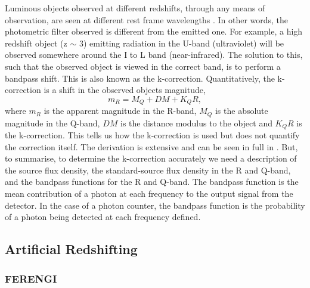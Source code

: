 \documentclass[fleqn,usenatbib]{mnras}
\begin{document}
Luminous objects observed at different redshifts, through any means of observation, are seen at different rest frame wavelengths \citep{Hogg2002}. In other words, the photometric filter observed is different from the emitted one. For example, a high redshift object (z $\sim$ 3) emitting radiation in the U-band (ultraviolet) will be observed somewhere around the I to L band (near-infrared). The solution to this, such that the observed object is viewed in the correct band, is to perform a bandpass shift. This is also known as the k-correction. Quantitatively, the k-correction is a shift in the observed objects magnitude,
\begin{equation}
\label{k_correction}
    m_R = M_Q + DM + K_QR,
\end{equation}
where $m_R$ is the apparent magnitude in the R-band, $M_Q$ is the absolute magnitude in the Q-band, $DM$ is the distance modulus to the object and $K_QR$ is the k-correction. This tells us how the k-correction is used but does not quantify the correction itself. The derivation is extensive and can be seen in full in \citet{Hogg2002}. But, to summarise, to determine the k-correction accurately we need a description of the source flux density, the standard-source flux density in the R and Q-band, and the bandpass functions for the R and Q-band. The bandpass function is the mean contribution of a photon at each frequency to the output signal from the detector. In the case of a photon counter, the bandpass function is the probability of a photon being detected at each frequency defined.


\subsection{Artificial Redshifting}
\label{sec:current_work}

\subsubsection{FERENGI}
\label{sec:FERENGI}
\end{document}
